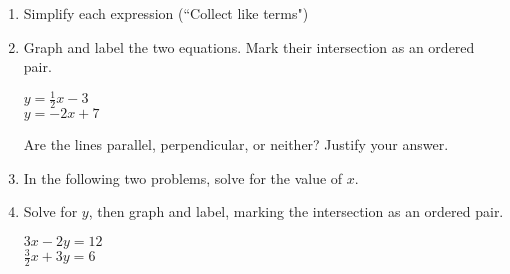 \documentclass[12pt, twoside]{article}
\begin{document}
\begin{enumerate}
\item Simplify each expression (``Collect like terms")
  \begin{enumerate}
  \end{enumerate}
  
  
\newpage

\item Graph and label the two equations. Mark their intersection as an ordered pair.

  \begin{multicols}{2}
    $y = \frac{1}{2}x-3$ \\
    $y = -2x + 7$
  \end{multicols}
  Are the lines parallel, perpendicular, or neither? Justify your answer.
  \vspace{1.5cm}

  \begin{center} %
  \end{center}

\item In the following two problems, solve for the value of $x$.
\begin{enumerate}
\end{enumerate}

\newpage
  \item Solve for $y$, then graph and label, marking the intersection as an ordered pair.
        \vspace{0.25cm}
        \begin{multicols}{2}
          $3x - 2y =  12$\\
          $\displaystyle \frac{3}{2} x + 3y = 6$
        \end{multicols}
        \vspace{2.25cm}


\end{enumerate}
\end{document}
